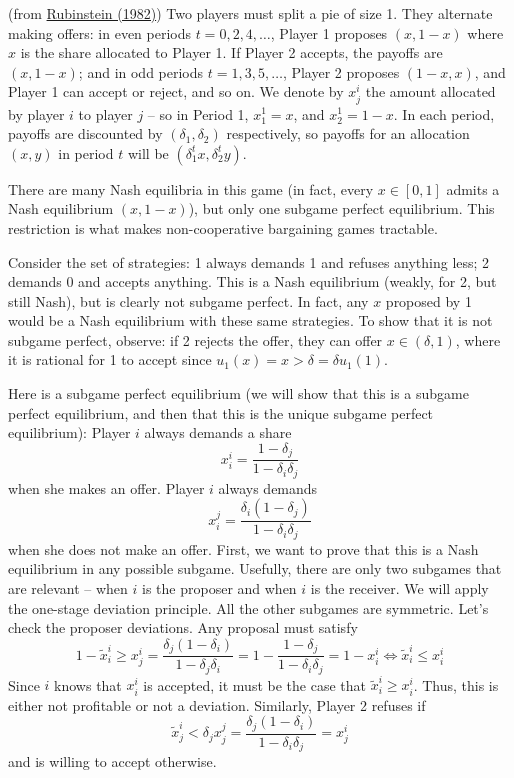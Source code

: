 \documentclass[10pt]{article}
\begin{document}
\begin{model}
	 (from \href{https://arielrubinstein.tau.ac.il/papers/11.pdf}{Rubinstein (1982)}) Two players must split a pie of size 1. They alternate making offers: in even periods $t = 0,2,4,\dots$, Player 1 proposes $(x,1-x)$ where $x$ is the share allocated to Player 1. If Player 2 accepts, the payoffs are $(x,1-x)$; and in odd periods $t = 1,3,5,\dots$, Player 2 proposes $(1-x,x)$, and Player 1 can accept or reject, and so on. We denote by $x_j^i$ the amount allocated by player $i$ to player $j$ -- so in Period 1, $x^1_1 = x$, and $x^1_2 = 1-x$. In each period, payoffs are discounted by $(\delta_1,\delta_2)$ respectively, so payoffs for an allocation $(x,y)$ in period $t$ will be $(\delta_1^t x, \delta_2^t y)$.
	
	\begin{remark}
		There are many Nash equilibria in this game (in fact, every $x\in [0,1]$ admits a Nash equilibrium $(x,1-x)$), but only one subgame perfect equilibrium. This restriction is what makes non-cooperative bargaining games tractable.
	\end{remark}
	
	Consider the set of strategies: 1 always demands 1 and refuses anything less; 2 demands 0 and accepts anything. This is a Nash equilibrium (weakly, for 2, but still Nash), but is clearly not subgame perfect. In fact, any $x$ proposed by 1 would be a Nash equilibrium with these same strategies. To show that it is not subgame perfect, observe: if 2 rejects the offer, they can offer $x \in (\delta,1)$, where it is rational for 1 to accept since $u_1(x) = x > \delta = \delta u_1(1)$. 
	
	Here is a subgame perfect equilibrium (we will show that this is a subgame perfect equilibrium, and then that this is the unique subgame perfect equilibrium): Player $i$ always demands a share \[x_i^i = \frac{1-\delta_j}{1-\delta_i\delta_j}\]when she makes an offer. Player $i$ always demands \[x_i^j = \frac{\delta_i(1-\delta_j)}{1-\delta_i\delta_j}\]when she does not make an offer. First, we want to prove that this is a Nash equilibrium in any possible subgame. Usefully, there are only two subgames that are relevant -- when $i$ is the proposer and when $i$ is the receiver. We will apply the one-stage deviation principle. All the other subgames are symmetric. Let's check the proposer deviations. Any proposal must satisfy\[1-\tilde{x}^i_i \ge x^i_j = \frac{\delta_j(1-\delta_i)}{1-\delta_j\delta_i} = 1 - \frac{1-\delta_j}{1-\delta_i\delta_j} = 1-x_i^i \Longleftrightarrow \tilde{x}^i_i \le x_i^i\]Since $i$ knows that $x^i_i$ is accepted, it must be the case that $\tilde{x}^i_i \ge x^i_i$. Thus, this is either not profitable or not a deviation. Similarly, Player 2 refuses if \[\tilde{x}^i_j < \delta_j x^j_j = \frac{\delta_j(1-\delta_i)}{1-\delta_i\delta_j} = x_j^i\]and is willing to accept otherwise. 
	

\end{model}
\end{document}
